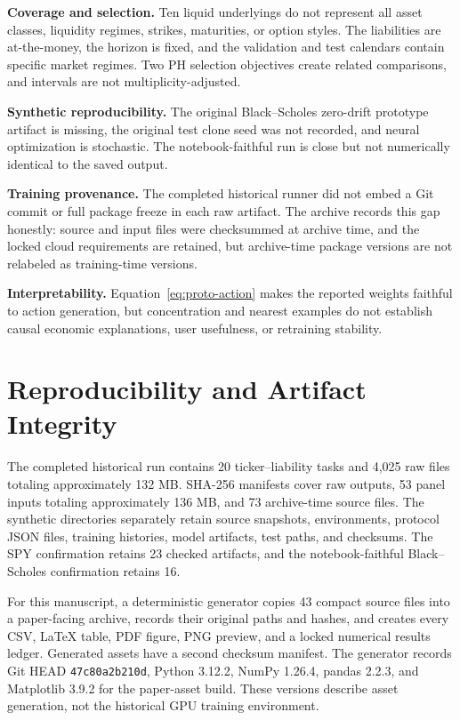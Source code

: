 \documentclass[conference]{IEEEtran}
\begin{document}
\textbf{Coverage and selection.} Ten liquid underlyings do not represent all
asset classes, liquidity regimes, strikes, maturities, or option styles. The
liabilities are at-the-money, the horizon is fixed, and the validation and test
calendars contain specific market regimes. Two PH selection objectives create
related comparisons, and intervals are not multiplicity-adjusted.

\textbf{Synthetic reproducibility.} The original Black--Scholes zero-drift
prototype artifact is missing, the original test clone seed was not recorded,
and neural optimization is stochastic. The notebook-faithful run is close but
not numerically identical to the saved output.

\textbf{Training provenance.} The completed historical runner did not embed a
Git commit or full package freeze in each raw artifact. The archive records
this gap honestly: source and input files were checksummed at archive time, and
the locked cloud requirements are retained, but archive-time package versions
are not relabeled as training-time versions.

\textbf{Interpretability.} Equation~\eqref{eq:proto-action} makes the reported
weights faithful to action generation, but concentration and nearest examples
do not establish causal economic explanations, user usefulness, or retraining
stability.

\section{Reproducibility and Artifact Integrity}

The completed historical run contains 20 ticker--liability tasks and 4,025 raw
files totaling approximately 132 MB. SHA-256 manifests cover raw outputs, 53
panel inputs totaling approximately 136 MB, and 73 archive-time source files.
The synthetic directories separately retain source snapshots, environments,
protocol JSON files, training histories, model artifacts, test paths, and
checksums. The SPY confirmation retains 23 checked artifacts, and the
notebook-faithful Black--Scholes confirmation retains 16.

For this manuscript, a deterministic generator copies 43 compact source files
into a paper-facing archive, records their original paths and hashes, and
creates every CSV, LaTeX table, PDF figure, PNG preview, and a locked numerical
results ledger. Generated assets have a second checksum manifest. The generator
records Git HEAD \texttt{47c80a2b210d}, Python 3.12.2, NumPy 1.26.4, pandas
2.2.3, and Matplotlib 3.9.2 for the paper-asset build. These versions describe
asset generation, not the historical GPU training environment.
\end{document}
